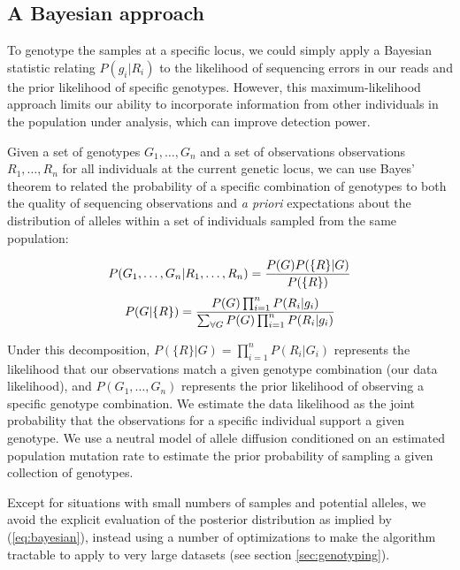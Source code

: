 \documentclass{article}
\begin{document}
\subsection{A Bayesian approach}
\label{sec:modeloverview}

To genotype the samples at a specific locus, we could simply apply a Bayesian statistic relating $P(g_i|R_i)$ to the likelihood of sequencing errors in our reads and the prior likelihood of specific genotypes.  However, this maximum-likelihood approach limits our ability to incorporate information from other individuals in the population under analysis, which can improve detection power.

Given a set of genotypes $G_1,\ldots,G_n$ and a set of observations observations $R_1,\ldots,R_n$ for all individuals at the current genetic locus, we can use Bayes' theorem to related the probability of a specific combination of genotypes to both the quality of sequencing observations and \emph{a priori} expectations about the distribution of alleles within a set of individuals sampled from the same population:


\begin{equation}
P(G_1,\ldots,G_n|R_1,\ldots,R_n) = { P(G) P(\{R\}|G) \over P(\{R\})} \\
\end{equation}
\begin{equation}
\label{eq:bayesian}
P(G|\{R\}) = { P(G) \prod_{i=1}^n P(R_i|g_i) \over 
\sum_{\forall{G}}  P(G) \prod_{i=1}^n P(R_i|g_i) }
\end{equation}

Under this decomposition, $P(\{R\}|G) = \prod_{i=1}^n P(R_i|G_i)$ represents the likelihood that our observations match a given genotype combination (our data likelihood), and $P(G_1,\ldots,G_n)$ represents the prior likelihood of observing a specific genotype combination.  We estimate the data likelihood as the joint probability that the observations for a specific individual support a given genotype.  We use a neutral model of allele diffusion conditioned on an estimated population mutation rate to estimate the prior probability of sampling a given collection of genotypes.

Except for situations with small numbers of samples and potential alleles, we avoid the explicit evaluation of the posterior distribution as implied by (\ref{eq:bayesian}), instead using a number of optimizations to make the algorithm tractable to apply to very large datasets (see section \ref{sec:genotyping}).
\end{document}
